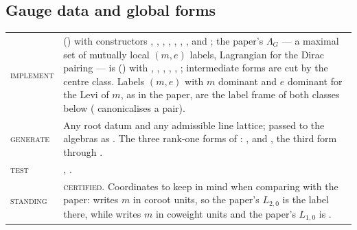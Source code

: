 \documentclass[11pt]{amsart}
\makeatletter
\theoremstyle{remark}
\newcommand{\peqref}[1]{\@ifundefined{r@P-#1}{\textup{[\texttt{\detokenize{#1}}]}}{\eqref{P-#1}}}
\newcommand{\CERTIFIED}{\textsc{certified}}
\newenvironment{machinery}{%
  \leavevmode\par\medskip\noindent
  \begin{tabular}{@{}>{\scshape}p{2.1cm}>{\raggedright\arraybackslash}p{\dimexpr\linewidth-2.5cm\relax}@{}}\toprule}%
  {\bottomrule\end{tabular}\par\medskip}
\makeatother
\begin{document}
\subsection{Gauge data and global forms}
\begin{machinery}
implement & \code{RootDatum} (\file{src/abe/root_datum.py}) with constructors \code{u_n}, \code{su_n}, \code{su_2}, \code{so_n}, \code{sp_n}, \code{b_n_simply_connected}, \code{g_2}, \code{product_datum} and \code{from_gauge_datum}; the paper's $\Lambda_G$ --- a maximal set of mutually local $(m,e)$ labels, Lagrangian for the Dirac pairing --- is \code{LineLattice} (\file{src/gn/global_form.py}) with \code{simply_connected_lines}, \code{adjoint_lines}, \code{verify_dirac_integral}, \code{verify_maximal}, \code{verify_lattices_are_dual}, \code{langlands_dual}; intermediate forms are cut by the centre class.  Labels $(m,e)$ with $m$ dominant and $e$ dominant for the Levi of $m$, as in the paper, are the label frame of both classes below (\code{fold} canonicalises a pair). \\
generate & Any root datum and any admissible line lattice; passed to the algebras as \code{lines=}.  The three rank-one forms of \peqref{eq:su2so3lat}: \code{simply_connected_lines(su_2())}, \code{adjoint_lines(su_2())} and \code{so_n(3)}, the third form through \code{lines=}. \\
test & \file{tests/test_root_datum.py}, \file{tests/test_global_form.py}. \\
standing & \CERTIFIED{}.  Coordinates to keep in mind when comparing with the paper: \code{su_2()} writes $m$ in coroot units, so the paper's $L_{2,0}$ is the label \code{((1,),(0,))} there, while \code{so_n(3)} writes $m$ in coweight units and the paper's $L_{1,0}$ is \code{((1,),(0,))}. \\
\end{machinery}
\end{document}

